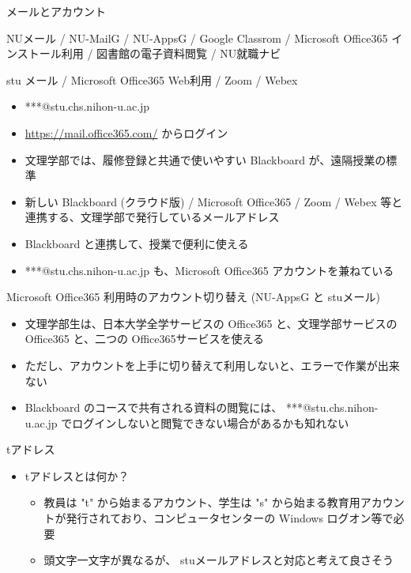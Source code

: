 \documentclass[a4j,10pt]{jsarticle}
\begin{document}
{\begin{frame}[label={sec:orgf27b200},fragile]{メールとアカウント}
\begin{block}{NUメール / NU-MailG / NU-AppsG / Google Classrom / Microsoft Office365 インストール利用 / 図書館の電子資料閲覧 / NU就職ナビ}
\begin{itemize}
\begin{itemize}
\end{itemize}
\end{itemize}
\end{block}
\par
\begin{block}{stu メール / Microsoft Office365 Web利用 / Zoom / Webex}
\begin{itemize}
\item ***@stu.chs.nihon-u.ac.jp
\item \url{https://mail.office365.com/} からログイン
\item 文理学部では、履修登録と共通で使いやすい Blackboard が、遠隔授業の標準
\item 新しい Blackboard (クラウド版) / Microsoft Office365 / Zoom / Webex 等と連携する、文理学部で発行しているメールアドレス
\item Blackboard と連携して、授業で便利に使える
\item ***@stu.chs.nihon-u.ac.jp も、Microsoft Office365 アカウントを兼ねている
\end{itemize}
\end{block}
\par
\begin{block}{Microsoft Office365 利用時のアカウント切り替え (NU-AppsG と stuメール)}
\begin{itemize}
\item 文理学部生は、日本大学全学サービスの Office365 と、文理学部サービスの Office365 と、二つの Office365サービスを使える
\item ただし、アカウントを上手に切り替えて利用しないと、エラーで作業が出来ない
\item Blackboard のコースで共有される資料の閲覧には、  ***@stu.chs.nihon-u.ac.jp でログインしないと閲覧できない場合があるかも知れない
\end{itemize}
\end{block}
\par
\begin{block}{tアドレス}
\begin{itemize}
\item tアドレスとは何か？
\begin{itemize}
\item 教員は "t" から始まるアカウント、学生は "s" から始まる教育用アカウントが発行されており、コンピュータセンターの Windows ログオン等で必要
\item 頭文字一文字が異なるが、 stuメールアドレスと対応と考えて良さそう
\end{itemize}
\par

\end{itemize}
\end{block}
\end{frame}}
\end{document}
